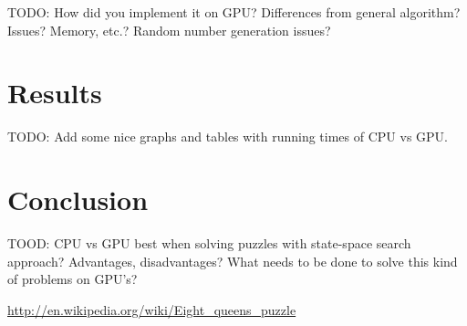 \documentclass{article}
\begin{document}
TODO: How did you implement it on GPU? Differences from general algorithm? Issues?
Memory, etc.? Random number generation issues?

\section{Results}

TODO: Add some nice graphs and tables with running times of CPU vs GPU.

\section{Conclusion}

TOOD: CPU vs GPU best when solving puzzles with state-space search approach? Advantages, 
disadvantages? What needs to be done to solve this kind of problems on GPU's?

\begin{thebibliography}{9}

	\url{http://en.wikipedia.org/wiki/Eight_queens_puzzle}

\end{thebibliography} 
\end{document}
